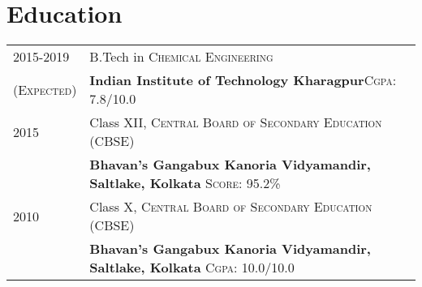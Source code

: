 \documentclass[a4paper,11pt]{extarticle} %
\begin{document}



\section{Education}

\begin{tabular}{R{3.5cm}|p{14.5cm}}	
2015-2019 & B.Tech in \textsc{Chemical Engineering}\\
\textsc{(Expected)}&\textbf{Indian Institute of Technology Kharagpur}\hfill\textsc{Cgpa}: 7.8/10.0\\



2015& Class XII, \textsc{}\textsc{Central Board of Secondary Education (CBSE)} \\
&\normalsize\textbf{Bhavan's Gangabux Kanoria Vidyamandir, Saltlake, Kolkata} \hfill\textsc{Score}: 95.2\%\\



2010 & Class X, \textsc{}\textsc{Central Board of Secondary Education (CBSE)} \\
&\normalsize\textbf{Bhavan's Gangabux Kanoria Vidyamandir, Saltlake, Kolkata} \hfill\textsc{Cgpa}: 10.0/10.0\\

\end{tabular}

\end{document}
